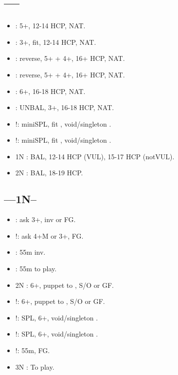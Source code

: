 \documentclass[12pt,twoside,a5paper]{report}%
\begin{document}
	\section*{----}
	\begin{itemize}
	\renewcommand{\labelitemi}{}
	\item {} : 5+\cl{}, 12-14 HCP, NAT.
	\item {} : 3+\di{}, fit, 12-14 HCP, NAT.
	\item {} : reverse, 5+\cl{} + 4+\he{}, 16+ HCP, NAT.
	\item {} : reverse, 5+\cl{} + 4+\sp{}, 16+ HCP, NAT.
	\item {} : 6+\cl{}, 16-18 HCP, NAT.
	\item {} : UNBAL, 3+\di{}, 16-18 HCP, NAT.
	\item {}!: miniSPL, fit \di{}, void/singleton \he{}.
	\item {}!: miniSPL, fit \di{}, void/singleton \sp{}.
	\item 1N : BAL, 12-14 HCP (VUL), 15-17 HCP (notVUL).
	\item 2N : BAL, 18-19 HCP.
	\end{itemize}

	\subsection*{----1N--}
	\begin{itemize}
	\renewcommand{\labelitemi}{}
	\item {} : ask 3+\di{}, inv or FG.
	\item {}!: ask 4+M or 3+\di{}, FG.
	\item {} : 55m inv.
	\item {} : 55m to play.
	\item 2N : 6+\cl{}, puppet to , S/O or GF.
	\item {}!: 6+\di{}, puppet to , S/O or GF.
	\item {}!: SPL, 6+\di{}, void/singleton \he{}.
	\item {}!: SPL, 6+\di{}, void/singleton \sp{}.
	\item {}!: 55m, FG.
	\item 3N : To play.
	\end{itemize}

\end{document}
